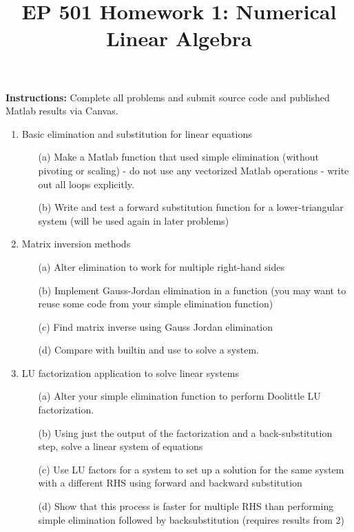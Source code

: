 \documentclass{article}
\begin{document}
\title{EP 501 Homework 1:  Numerical Linear Algebra}

\maketitle

\textbf{Instructions:}  Complete all problems and submit source code and published Matlab results via Canvas.  

\begin{enumerate}
  \item Basic elimination and substitution for linear equations
  \begin{itemize}
    \item[(a)] Make a Matlab function that used simple elimination (without pivoting or scaling) - do not use any vectorized Matlab operations - write out all loops explicitly.  
    \item[(b)] Write and test a forward substitution function for a lower-triangular system (will be used again in later problems)
  \end{itemize}
  \item Matrix inversion methods
  \begin{itemize}
    \item[(a)] Alter elimination to work for multiple right-hand sides
    \item[(b)] Implement Gauss-Jordan elimination in a function (you may want to reuse some code from your simple elimination function)
    \item[(c)] Find matrix inverse using Gauss Jordan elimination
    \item[(d)] Compare with builtin and use to solve a system.  
  \end{itemize}
  \item LU factorization application to solve linear systems
  \begin{itemize}
    \item[(a)] Alter your simple elimination function to perform Doolittle LU factorization.  
    \item[(b)] Using just the output of the factorization and a back-substitution step, solve a linear system of equations
    \item[(c)] Use LU factors for a system to set up a solution for the same system with a different RHS using forward and backward substitution
    \item[(d)] Show that this process is faster for multiple RHS than performing simple elimination followed by backsubstitution (requires results from 2)

\end{itemize}
\end{enumerate}
\end{document}
